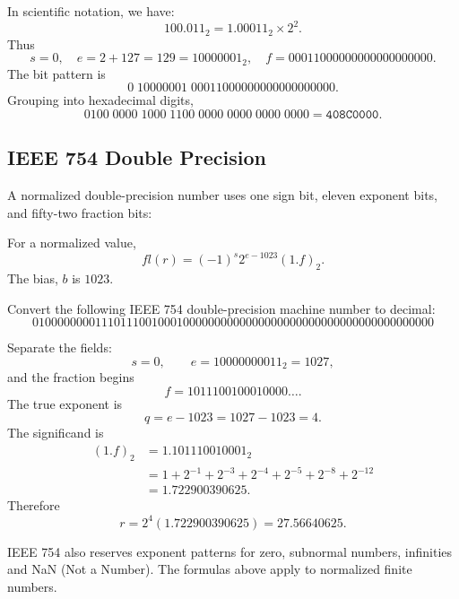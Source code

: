 \begin{solution}[5.5cm]
In scientific notation, we have:
\[
 100.011_2=1.00011_2\times2^2.
\]
Thus
\[
 s=0,
 \quad e=2+127=129=10000001_2,
\quad f=00011000000000000000000.
\]
The bit pattern is
\[
 0\;10000001\;00011000000000000000000.
\]
Grouping into hexadecimal digits,
\[
 0100\;0000\;1000\;1100\;0000\;0000\;0000\;0000
 =\boxed{\texttt{408C0000}}.
\]
\end{solution}

\subsection{IEEE 754 Double Precision}

A normalized double-precision number uses one sign bit, eleven exponent bits, and fifty-two fraction bits:

\begin{center}
\end{center}

For a normalized value,
\[
  fl(r)=(-1)^s2^{e-1023}(1.f)_2.
\]
The bias, $b$ is $1023$.

\begin{example}
Convert the following IEEE 754 double-precision machine number to decimal:
\[
0100000000111011100100010000000000000000000000000000000000000000
\]
\end{example}

\begin{solution}[5.8cm]
Separate the fields:
\[
 s=0,
 \qquad e=10000000011_2=1027,
\]
and the fraction begins
\[
 f=1011100100010000\ldots.
\]
The true exponent is
\[
 q=e-1023=1027-1023=4.
\]
The significand is
\[
\begin{aligned}
(1.f)_2
 &=1.101110010001_2\\
 &=1+2^{-1}+2^{-3}+2^{-4}+2^{-5}+2^{-8}+2^{-12}\\
 &=1.722900390625.
\end{aligned}
\]
Therefore
\[
 r=2^4(1.722900390625)=\boxed{27.56640625}.
\]
\end{solution}

\begin{remark}
IEEE 754 also reserves exponent patterns for zero, subnormal numbers, infinities and NaN (Not a Number). The formulas above apply to normalized finite numbers.
\end{remark}

